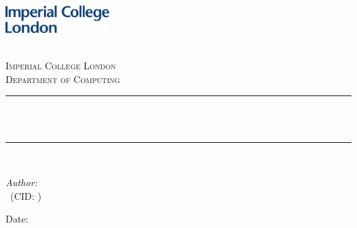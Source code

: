 \begin{titlepage}

\newcommand{\HRule}{\rule{\linewidth}{0.5mm}} %



\includegraphics[width = 4cm]{./figures/imperial}\\[0.5cm] 

\begin{center} %

\textsc{\LARGE \reporttype}\\[1.5cm] 
\textsc{\Large Imperial College London}\\[0.5cm] 
\textsc{\large Department of Computing}\\[0.5cm] 

\HRule \\[0.4cm]
{ \huge \bfseries \reporttitle}\\ %
\HRule \\[1.5cm]
\end{center}

\begin{flushleft} \large
\textit{Author:}\\
\reportauthor~(CID: \cid) %
\end{flushleft}
\vspace{2cm}
\makeatletter
Date: \@date 

\vfill %



\makeatother


\end{titlepage}

